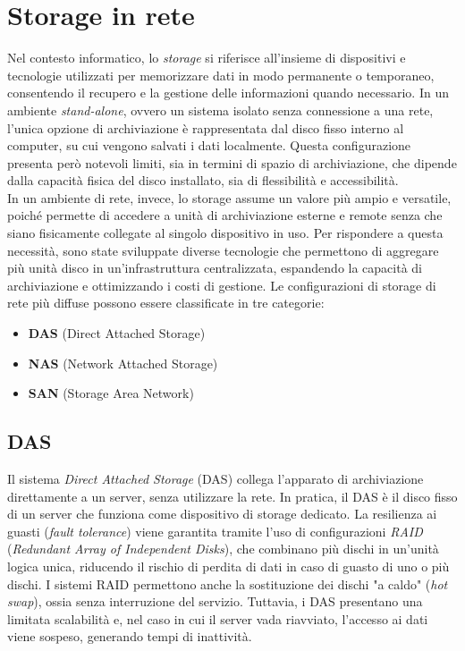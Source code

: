 \documentclass[12pt]{report}
\begin{document}
	\chapter{Storage in rete}
	Nel contesto informatico, lo \textit{storage} si riferisce all'insieme di dispositivi e tecnologie utilizzati per memorizzare dati in modo permanente o temporaneo, consentendo il recupero e la gestione delle informazioni quando necessario. In un ambiente \textit{stand-alone}, ovvero un sistema isolato senza connessione a una rete, l'unica opzione di archiviazione è rappresentata dal disco fisso interno al computer, su cui vengono salvati i dati localmente. Questa configurazione presenta però notevoli limiti, sia in termini di spazio di archiviazione, che dipende dalla capacità fisica del disco installato, sia di flessibilità e accessibilità.
	\vspace{\baselineskip}\\
	In un ambiente di rete, invece, lo storage assume un valore più ampio e versatile, poiché permette di accedere a unità di archiviazione esterne e remote senza che siano fisicamente collegate al singolo dispositivo in uso. Per rispondere a questa necessità, sono state sviluppate diverse tecnologie che permettono di aggregare più unità disco in un’infrastruttura centralizzata, espandendo la capacità di archiviazione e ottimizzando i costi di gestione. Le configurazioni di storage di rete più diffuse possono essere classificate in tre categorie:
	\begin{itemize}
		\item \textbf{DAS} (Direct Attached Storage)
		\item \textbf{NAS} (Network Attached Storage)
		\item \textbf{SAN} (Storage Area Network)
	\end{itemize}
	
	\section{DAS}
	Il sistema \textit{Direct Attached Storage} (DAS) collega l'apparato di archiviazione direttamente a un server, senza utilizzare la rete. In pratica, il DAS è il disco fisso di un server che funziona come dispositivo di storage dedicato. La resilienza ai guasti (\textit{fault tolerance}) viene garantita tramite l’uso di configurazioni \textit{RAID} (\textit{Redundant Array of Independent Disks}), che combinano più dischi in un’unità logica unica, riducendo il rischio di perdita di dati in caso di guasto di uno o più dischi. I sistemi RAID permettono anche la sostituzione dei dischi "a caldo" (\textit{hot swap}), ossia senza interruzione del servizio. Tuttavia, i DAS presentano una limitata scalabilità e, nel caso in cui il server vada riavviato, l’accesso ai dati viene sospeso, generando tempi di inattività.
	
\end{document}

